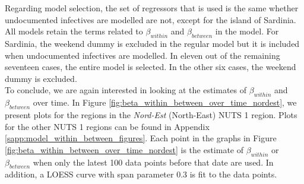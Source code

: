 \documentclass[12pt]{article}
\begin{document}
    Regarding model selection, the set of regressors that is used is the same whether undocumented infectives are modelled are not, except for the island of Sardinia. All models retain the terms related to $\beta_{within}$ and $\beta_{between}$ in the model. For Sardinia, the weekend dummy is excluded in the regular model but it is included when undocumented infectives are modelled. In eleven out of the remaining seventeen cases, the entire model is selected. In the other six cases, the weekend dummy is excluded. \\
    
    To conclude, we are again interested in looking at the estimates of $\beta_{within}$ and $\beta_{between}$ over time. In Figure \ref{fig:beta_within_between_over_time_nordest}, we present plots for the regions in the \textit{Nord-Est} (North-East) NUTS 1 region. Plots for the other NUTS 1 regions can be found in Appendix \ref{sapp:model_within_between_figures}. Each point in the graphs in Figure \ref{fig:beta_within_between_over_time_nordest} is the estimate of $\beta_{within}$ or $\beta_{between}$ when only the latest 100 data points before that date are used. In addition, a LOESS curve with span parameter 0.3 is fit to the data points.
    
\end{document}
